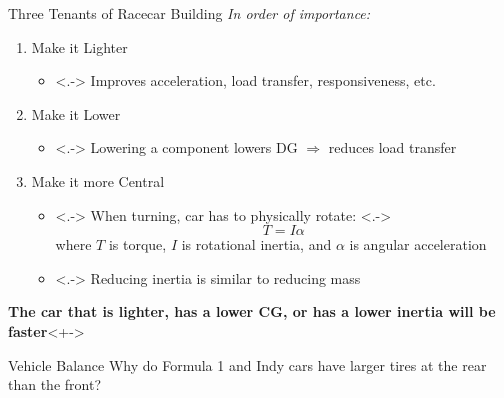 \documentclass[aspectratio=169]{beamer}
\begin{document}
\begin{frame}{Three Tenants of Racecar Building}
    \textit{In order of importance:}
    \begin{enumerate}
        \item<+-> Make it Lighter
            \begin{itemize}
                \item<.-> Improves acceleration, load transfer, responsiveness, etc.
            \end{itemize}
        \item<+-> Make it Lower
            \begin{itemize}
                \item<.-> Lowering a component lowers DG \(\Rightarrow\) reduces load transfer
            \end{itemize}
        \item<+-> Make it more Central
            \begin{itemize}
                \item<.-> When turning, car has to physically rotate:
                    \onslide<.->{
                        \[T=I\alpha\]
                        where \(T\) is torque, \(I\) is rotational inertia, and \(\alpha\) is angular acceleration
                    }
                \item<.-> Reducing inertia is similar to reducing mass
            \end{itemize}
    \end{enumerate}
    \begin{alertblock}{\textbf{The car that is lighter, has a lower CG, or has a lower inertia will be faster}}<+->
    \end{alertblock}

\end{frame}

\begin{frame}{Vehicle Balance}
    \center
    Why do Formula 1 and Indy cars have larger tires at the rear than the front?
\end{frame}
\end{document}
